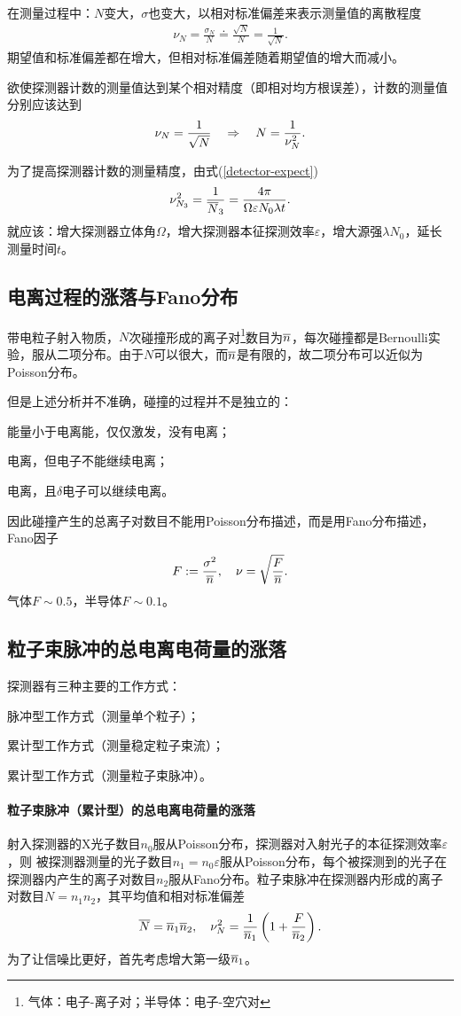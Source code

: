 在测量过程中：$N$变大，$\sigma$也变大，以相对标准偏差来表示测量值的离散程度
\begin{align}
	\nu_N=\frac{\sigma_N}N\doteq\frac{\sqrt N}N=\frac1{\sqrt N}.
\end{align}
期望值和标准偏差都在增大，但相对标准偏差随着期望值的增大而减小。

欲使探测器计数的测量值达到某个相对精度（即相对均方根误差），计数的测量值分别应该达到
\[
	\nu_N=\frac1{\sqrt N}\quad\Rightarrow\quad N=\frac1{\nu_N^2}.
\]

为了提高探测器计数的测量精度，由式(\ref{detector-expect})
\[
	\nu_{N_3}^2=\frac1{\overline N_3}=\frac{4\pi}{\Omega\varepsilon N_0\lambda t}.
\]
就应该：增大探测器立体角$\Omega$，增大探测器本征探测效率$\varepsilon$，增大源强$\lambda N_0$，延长测量时间$t$。
\subsection{电离过程的涨落与Fano分布}
带电粒子射入物质，$N$次碰撞形成的离子对\footnote{气体：电子-离子对；半导体：电子-空穴对}数目为$\overline n$，每次碰撞都是Bernoulli实验，服从二项分布。由于$N$可以很大，而$\overline n$是有限的，故二项分布可以近似为Poisson分布。

但是上述分析并不准确，碰撞的过程并不是独立的：
\begin{compactenum}
	\item 能量小于电离能，仅仅激发，没有电离；
	\item 电离，但电子不能继续电离；
	\item 电离，且$\delta$电子可以继续电离。
\end{compactenum}
因此碰撞产生的总离子对数目不能用Poisson分布描述，而是用Fano分布描述，Fano因子
\begin{align}
	F:=\frac{\sigma^2}{\overline n},\quad\nu=\sqrt{\frac F{\overline n}}.
\end{align}
气体$F\sim 0.5$，半导体$F\sim 0.1$。
\subsection{粒子束脉冲的总电离电荷量的涨落}
探测器有三种主要的工作方式：
\begin{compactitem}
	\item 脉冲型工作方式（测量单个粒子）；
	\item 累计型工作方式（测量稳定粒子束流）；
	\item 累计型工作方式（测量粒子束脉冲）。
\end{compactitem}
\paragraph{粒子束脉冲（累计型）的总电离电荷量的涨落}
射入探测器的X光子数目$n_0$服从Poisson分布，探测器对入射光子的本征探测效率$\varepsilon$，则
被探测器测量的光子数目$n_1=n_0\varepsilon$服从Poisson分布，每个被探测到的光子在探测器内产生的离子对数目$n_2$服从Fano分布。粒子束脉冲在探测器内形成的离子对数目$N=n_1n_2$，其平均值和相对标准偏差
\[
	\overline N=\overline n_1\overline n_2,\quad\nu_N^2=\frac1{\overline n_1}\left(1+\frac F{\overline n_2}\right).
\]
为了让信噪比更好，首先考虑增大第一级$\overline n_1$。
